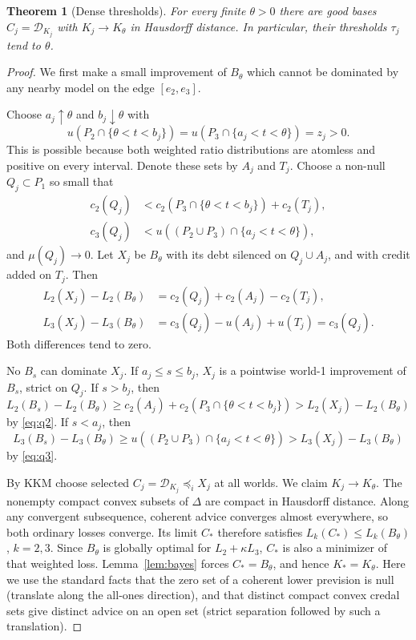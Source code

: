 \documentclass[11pt]{article}
\newtheorem{theorem}{Theorem}
\theoremstyle{remark}\newtheorem{remark}[theorem]{Remark}
\newcommand{\Dscr}{\mathcal D}
\begin{document}
\begin{theorem}[Dense thresholds]\label{thm:dense}
For every finite $\theta>0$ there are good bases $C_j=\Dscr_{K_j}$ with
$K_j\to K_\theta$ in Hausdorff distance. In particular, their thresholds
$\tau_j$ tend to $\theta$.
\end{theorem}
\begin{proof}
We first make a small improvement of $B_\theta$ which cannot be dominated
by any nearby model on the edge $[e_2,e_3]$.

Choose $a_j\uparrow\theta$ and $b_j\downarrow\theta$ with
\[
 u(P_2\cap\{\theta<t<b_j\})
 =u(P_3\cap\{a_j<t<\theta\})=z_j>0.
\]
This is possible because both weighted ratio distributions are atomless
and positive on every interval. Denote these sets by $A_j$ and $T_j$.
Choose a non-null $Q_j\subset P_1$ so small that
\begin{align}
 c_2(Q_j)&<c_2(P_3\cap\{\theta<t<b_j\})+c_2(T_j),\label{eq:q2}\\
 c_3(Q_j)&<u((P_2\cup P_3)\cap\{a_j<t<\theta\}),\label{eq:q3}
\end{align}
and $\mu(Q_j)\to0$. Let $X_j$ be $B_\theta$ with its debt silenced on
$Q_j\cup A_j$, and with credit added on $T_j$. Then
\begin{align*}
 L_2(X_j)-L_2(B_\theta)&=c_2(Q_j)+c_2(A_j)-c_2(T_j),\\
 L_3(X_j)-L_3(B_\theta)&=c_3(Q_j)-u(A_j)+u(T_j)=c_3(Q_j).
\end{align*}
Both differences tend to zero.

No $B_s$ can dominate $X_j$. If $a_j\le s\le b_j$, $X_j$ is a pointwise
world-1 improvement of $B_s$, strict on $Q_j$. If $s>b_j$, then
\[
 L_2(B_s)-L_2(B_\theta)
 \ge c_2(A_j)+c_2(P_3\cap\{\theta<t<b_j\})
 >L_2(X_j)-L_2(B_\theta)
\]
by \eqref{eq:q2}. If $s<a_j$, then
\[
 L_3(B_s)-L_3(B_\theta)
 \ge u((P_2\cup P_3)\cap\{a_j<t<\theta\})
 >L_3(X_j)-L_3(B_\theta)
\]
by \eqref{eq:q3}.

By KKM choose selected $C_j=\Dscr_{K_j}\preceq_iX_j$ at all worlds.
We claim $K_j\to K_\theta$. The nonempty compact convex subsets of
$\Delta$ are compact in Hausdorff distance. Along any convergent
subsequence, coherent advice converges almost everywhere, so both ordinary
losses converge. Its limit $C_*$ therefore satisfies
$L_k(C_*)\le L_k(B_\theta)$, $k=2,3$. Since $B_\theta$ is globally
optimal for $L_2+\kappa L_3$, $C_*$ is also a minimizer of that weighted
loss. Lemma~\ref{lem:bayes} forces
$C_*=B_\theta$, and hence $K_*=K_\theta$.
Here we use the standard facts that the zero set of a coherent lower
prevision is null (translate along the all-ones direction), and that
distinct compact convex credal sets give distinct advice on an open set
(strict separation followed by such a translation).


\end{proof}
\end{document}
